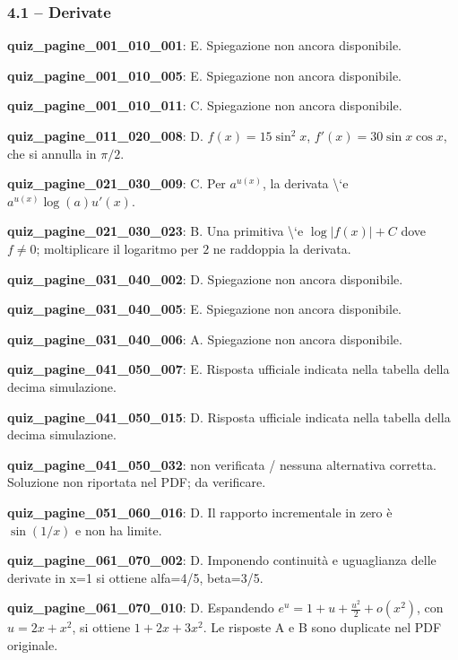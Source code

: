 \documentclass[11pt,a4paper]{article}
\newcounter{quiz}
\begin{document}
\subsubsection*{4.1 -- Derivate}
\noindent\textbf{quiz\_pagine\_001\_010\_001}: E. Spiegazione non ancora disponibile.\par\medskip
\noindent\textbf{quiz\_pagine\_001\_010\_005}: E. Spiegazione non ancora disponibile.\par\medskip
\noindent\textbf{quiz\_pagine\_001\_010\_011}: C. Spiegazione non ancora disponibile.\par\medskip
\noindent\textbf{quiz\_pagine\_011\_020\_008}: D. $f(x)=15\sin^2x$, $f\prime(x)=30\sin x\cos x$, che si annulla in $\pi/2$.\par\medskip
\noindent\textbf{quiz\_pagine\_021\_030\_009}: C. Per $a^{u(x)}$, la derivata \textbackslash{}`e $a^{u(x)}\log(a)u\prime(x)$.\par\medskip
\noindent\textbf{quiz\_pagine\_021\_030\_023}: B. Una primitiva \textbackslash{}`e $\log|f(x)|+C$ dove $f\ne0$; moltiplicare il logaritmo per $2$ ne raddoppia la derivata.\par\medskip
\noindent\textbf{quiz\_pagine\_031\_040\_002}: D. Spiegazione non ancora disponibile.\par\medskip
\noindent\textbf{quiz\_pagine\_031\_040\_005}: E. Spiegazione non ancora disponibile.\par\medskip
\noindent\textbf{quiz\_pagine\_031\_040\_006}: A. Spiegazione non ancora disponibile.\par\medskip
\noindent\textbf{quiz\_pagine\_041\_050\_007}: E. Risposta ufficiale indicata nella tabella della decima simulazione.\par\medskip
\noindent\textbf{quiz\_pagine\_041\_050\_015}: D. Risposta ufficiale indicata nella tabella della decima simulazione.\par\medskip
\noindent\textbf{quiz\_pagine\_041\_050\_032}: non verificata / nessuna alternativa corretta. Soluzione non riportata nel PDF; da verificare.\par\medskip
\noindent\textbf{quiz\_pagine\_051\_060\_016}: D. Il rapporto incrementale in zero è $\sin(1/x)$ e non ha limite.\par\medskip
\noindent\textbf{quiz\_pagine\_061\_070\_002}: D. Imponendo continuità e uguaglianza delle derivate in x=1 si ottiene alfa=4/5, beta=3/5.\par\medskip
\noindent\textbf{quiz\_pagine\_061\_070\_010}: D. Espandendo $e^u=1+u+\frac{u^2}{2}+o(x^2)$, con $u=2x+x^2$, si ottiene $1+2x+3x^2$. Le risposte A e B sono duplicate nel PDF originale.\par\medskip
\end{document}
